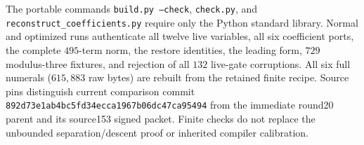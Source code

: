 The portable commands \texttt{build.py --check}, \texttt{check.py},
and \texttt{reconstruct\_coefficients.py} require only the Python standard
library. Normal and optimized runs authenticate all twelve live variables,
all six coefficient ports, the complete $495$-term norm, the restore identities,
the leading form, $729$ modulus-three fixtures, and rejection of all $132$
live-gate corruptions. All six full numerals ($615{,}883$ raw bytes) are rebuilt
from the retained finite recipe. Source pins distinguish current comparison
commit \texttt{892d73e1ab4bc5fd34ecca1967b06dc47ca95494} from the immediate
round20 parent and its source153 signed packet. Finite checks do not replace
the unbounded separation/descent proof or inherited compiler calibration.
